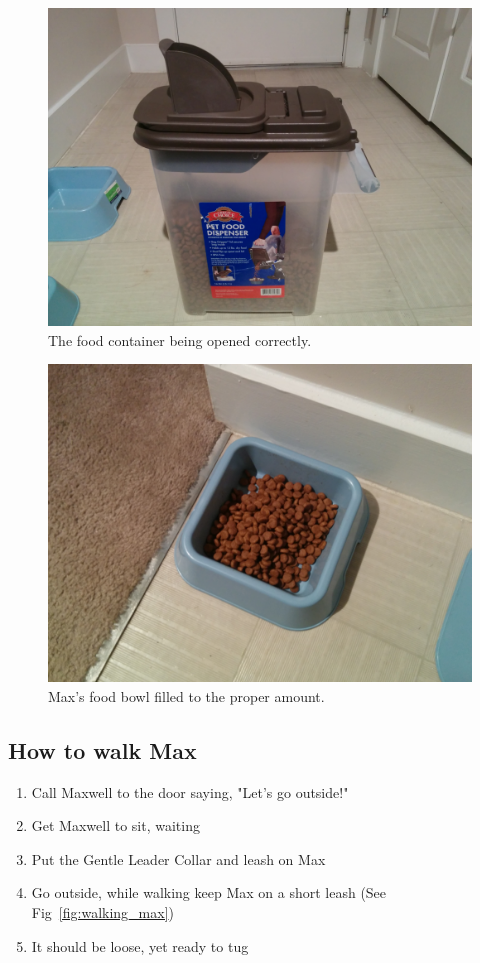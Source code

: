 \documentclass[pdftex,12pt]{article}
\begin{document}
\bigskip

\begin{figure}[h!]
    \centering
    \includegraphics[width=.35\textwidth]{./images/how_to/feed_max/food_container_open.jpg}
    \caption{The food container being opened correctly.}
    \label{fig:food_container_open}
\end{figure}

\bigskip

\begin{figure}[h!]
    \centering
    \includegraphics[width=.35\textwidth]{./images/how_to/feed_max/food_bowl_filled.jpg}
    \caption{Max's food bowl filled to the proper amount.}
    \label{fig:food_bowl_filled}
\end{figure}

\subsection{How to walk Max}
\begin{enumerate}\label{itm:how_to_walk}
    \item Call Maxwell to the door saying, "Let's go outside!"
    \item Get Maxwell to sit, waiting
    \item Put the Gentle Leader Collar and leash on Max
    \item Go outside, while walking keep Max on a short leash
        (See Fig~\ref{fig:walking_max})
    \item It should be loose, yet ready to tug
\end{enumerate}
\end{document}
